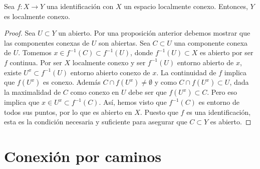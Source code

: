 \begin{prop}
Sea $\displaystyle f : X \to Y $ una identificación con $\displaystyle X $ un espacio localmente conexo. Entonces, $\displaystyle Y $ es localmente conexo. 
\end{prop}
\begin{proof}
Sea $\displaystyle U\subset Y $ un abierto. Por una proposición anterior debemos mostrar que las componentes conexas de $\displaystyle U $ son abiertas. Sea $\displaystyle C \subset U $ una componente conexa de $\displaystyle U $. Tomemos $\displaystyle x \in f^{-1}\left(C\right)\subset f^{-1}\left(U\right) $, donde $\displaystyle f^{-1}\left(U\right)\subset X $ es abierto por ser $\displaystyle f $ continua. 
Por ser $\displaystyle X $ localmente conexo y ser $\displaystyle f^{-1}\left(U\right) $ entorno abierto de $\displaystyle x $, existe $\displaystyle U^{x}\subset f^{-1}\left(U\right) $ entorno abierto conexo de $\displaystyle x $.
La continuidad de $\displaystyle f $ implica que $\displaystyle f\left(U^{x}\right) $ es conexo. Además $\displaystyle C \cap f\left(U^{x}\right)\neq \emptyset $ y como $\displaystyle C \cap f\left(U^{x}\right)\subset U $, dada la maximalidad de $\displaystyle C $ como conexo en $\displaystyle U $ debe ser que $\displaystyle f\left(U^{x}\right)\subset C $. Pero eso implica que $\displaystyle x \in U^{x}\subset f^{-1}\left(C\right) $. Así, hemos visto que $\displaystyle f^{-1}\left(C\right) $ es entorno de todos sus puntos, por lo que es abierto en $\displaystyle X $. Puesto que $\displaystyle f $ es una identificación, esta es la condición necesaria y suficiente para asegurar que $\displaystyle C\subset Y $ es abierto.
\end{proof}
\section{Conexión por caminos}
